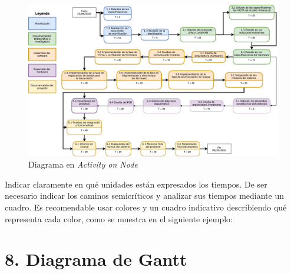 \documentclass[11pt]{charter}
\begin{document}
\begin{figure}[htpb]
\centering 
\includegraphics[width=.8\textwidth]{./Figuras/AoN.png}
\caption{Diagrama en \textit{Activity on Node}}
\label{fig:AoN}
\end{figure}

Indicar claramente en qué unidades están expresados los tiempos.
De ser necesario indicar los caminos semicríticos y analizar sus tiempos mediante un cuadro.
Es recomendable usar colores y un cuadro indicativo describiendo qué representa cada color, como se muestra en el siguiente ejemplo:



\section{8. Diagrama de Gantt}
\label{sec:gantt}
\end{document}
